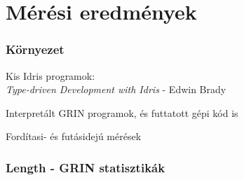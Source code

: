 \documentclass[bigger]{beamer}
\begin{document}
\section{M\'er\'esi eredm\'enyek}

\begin{frame}[fragile]
\frametitle{Környezet}

	\vspace{1.5cm}
	\begin{vfitemize}
		\item Kis Idris programok: \\
		\textit{Type-driven Development with Idris} - Edwin Brady
		\item Interpretált GRIN programok, és futtatott gépi kód is
		\item Fordítasi- és futásidejú mérések
	\end{vfitemize}

	\vspace{-0.5cm}
	\begin{figure}[H] 
		\centering
		\begin{adjustbox}{scale = 0.75}
			
		\end{adjustbox}
	\end{figure}

\end{frame}



\begin{frame}[fragile]
\frametitle{Length - GRIN statisztikák}
	
	\begin{figure}
		\hspace{-1cm}
		\begin{minipage}{0.45\textwidth}
		\end{minipage}
		\hspace{1cm}
		\begin{minipage}{0.45\textwidth}
		\end{minipage}
	\end{figure}
	
\end{frame}
\end{document}
